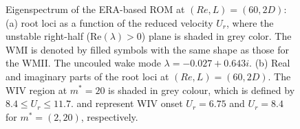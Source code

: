 \begin{figure}
\begin{subfigure}{0.495\textwidth}
    \caption{}
    \label{•}
    \end{subfigure} 
  \caption{Eigenspectrum of the ERA-based ROM at $(Re,L)=(60,2D)$: 
     (a) root loci as a function of the reduced velocity $U_r$, 
     where the unstable right-half (Re$(\lambda) > 0$) plane is shaded in grey color.
     The WMI is denoted by filled symbols with the same shape as those for the WMII. 
     The uncouled wake mode $\lambda=-0.027+0.643i$.
     (b) Real and imaginary parts of the root loci at $(Re,L)=(60,2D)$.
     The WIV region at $m^*=20$ is shaded in grey colour, which is defined by 
     $8.4 \le U_{r} \le 11.7$.
     {\protect\reddash} and {\protect\bluedash} represent WIV onset $U_r=6.75$ 
      and $U_r=8.4$ for $m^*=(2,20)$, respectively.}
\label{fig:ld2_eig_square}  
\end{figure}




